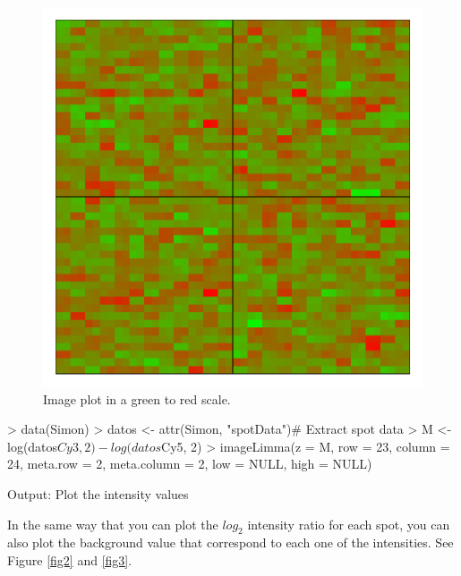 \documentclass[12pt]{article}
\begin{document}
\begin{figure}[h]
\begin{center}
\includegraphics{example-genArise-003}
\caption{Image plot in a green to red scale.\label{fig1}}
\end{center}
\end{figure}
\begin{Scode}
> data(Simon)
> datos <- attr(Simon, "spotData")# Extract spot data
> M <- log(datos$Cy3, 2) - log(datos$Cy5, 2)
> imageLimma(z = M, row = 23, column = 24, meta.row = 2, 
  meta.column = 2, low = NULL, high = NULL)
\end{Scode}

\begin{Soutput}
Output: Plot the intensity values
\end{Soutput}

In the same way that you can plot the $log_2$ intensity ratio for each spot, you can also plot the background value that correspond to each one of the intensities. See Figure \ref{fig2} and \ref{fig3}.\\
\end{document}
